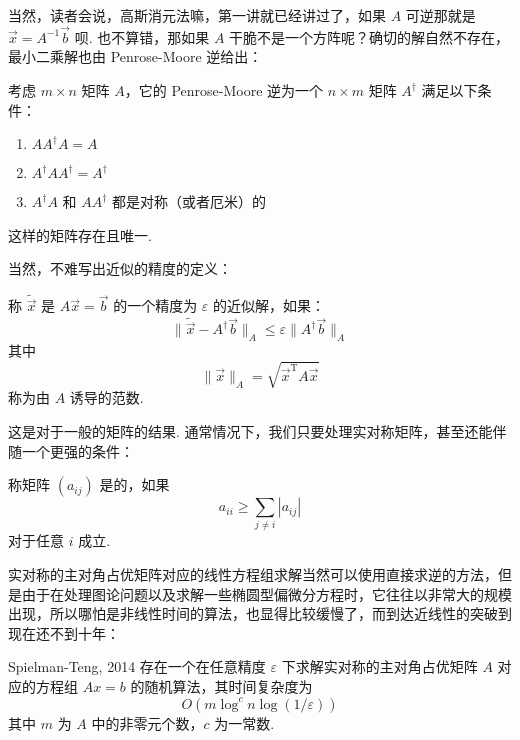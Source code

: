 当然，读者会说，高斯消元法嘛，第一讲就已经讲过了，如果 $A$ 可逆那就是 $\vec{x} = A^{-1}\vec{b}$ 呗. 也不算错，那如果 $A$ 干脆不是一个方阵呢？确切的解自然不存在，最小二乘解也由 Penrose-Moore 逆给出：

\begin{definition}{}{}
    考虑 $m \times n$ 矩阵 $A$，它的 Penrose-Moore 逆为一个 $n \times m$ 矩阵 $A^\dagger$ 满足以下条件：

    \begin{enumerate}
        \item $A A^\dagger A = A$

        \item $A^\dagger A A^\dagger = A^\dagger$

        \item $A^\dagger A$ 和 $AA^\dagger$ 都是对称（或者厄米）的
    \end{enumerate}

    这样的矩阵存在且唯一.
\end{definition}

当然，不难写出近似的精度的定义：

\begin{definition}{}{}
    称 $\widetilde{\vec{x}}$ 是 $A\vec{x} = \vec{b}$ 的一个精度为 $\varepsilon$ 的近似解，如果：
    \[ \lVert \widetilde{\vec{x}} - A^\dagger \vec{b} \rVert_A \leqslant \varepsilon \lVert A^\dagger \vec{b} \rVert_A \]
    其中
    \[ \lVert \vec{x} \rVert_A = \sqrt{\vec{x}^\mathrm{T}A\vec{x}} \]
    称为由 $A$ 诱导的范数.
\end{definition}

这是对于一般的矩阵的结果. 通常情况下，我们只要处理实对称矩阵，甚至还能伴随一个更强的条件：

\begin{definition}{}{}
    称矩阵 $(a_{ij})$ 是的，如果
    \[ a_{ii} \geqslant \sum_{j \neq i} |a_{ij}| \]
    对于任意 $i$ 成立.
\end{definition}

实对称的主对角占优矩阵对应的线性方程组求解当然可以使用直接求逆的方法，但是由于在处理图论问题以及求解一些椭圆型偏微分方程时，它往往以非常大的规模出现，所以哪怕是非线性时间的算法，也显得比较缓慢了，而到达近线性的突破到现在还不到十年：

\begin{theorem}{Spielman-Teng, 2014}{}
    存在一个在任意精度 $\varepsilon$ 下求解实对称的主对角占优矩阵 $A$ 对应的方程组 $Ax = b$ 的随机算法，其时间复杂度为
    \[ O(m \log^c n \log(1 / \varepsilon)) \]
    其中 $m$ 为 $A$ 中的非零元个数，$c$ 为一常数.
\end{theorem}

